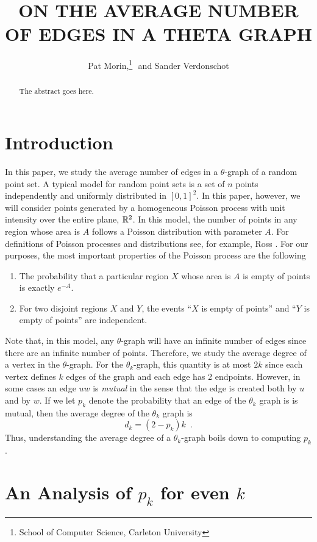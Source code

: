 \documentclass{patmorin}
\title{\MakeUppercase{On the Average Number of Edges in a Theta Graph}}
\author{Pat Morin,\thanks{School of Computer Science, Carleton University}\,\,
         and Sander Verdonschot\footnotemark[1]}
\begin{document}
\maketitle

\begin{abstract}
  The abstract goes here.
\end{abstract}

\section{Introduction}

In this paper, we study the average number of edges in a $\theta$-graph
of a random point set.  A typical model for random point sets is a set
of $n$ points independently and uniformly distributed in $[0,1]^2$.
In this paper, however, we will consider points generated by a
homogeneous Poisson process with unit intensity over the entire
plane, $\mathbb{R}^2$.  In this model, the number of points in any region
whose area is $A$ follows a Poisson distribution with parameter $A$.
For definitions of Poisson processes and distributions see, for example,
Ross \cite[Chapter~2]{ross:introduction}.  For our purposes, the most
important properties of the Poisson process are the following
\begin{enumerate}
\item The probability  that a particular region $X$ whose area is $A$
   is empty of points is exactly $e^{-A}$.
\item For two disjoint regions $X$ and $Y$, the events ``$X$ is empty
   of points'' and ``$Y$ is empty of points'' are independent.
\end{enumerate}
Note that, in this model, any $\theta$-graph will have an infinite number
of edges since there are an infinite number of points.  Therefore,
we study the average degree of a vertex in the $\theta$-graph.  For the
$\theta_k$-graph, this quantity is at most $2k$ since each vertex defines
$k$ edges of the graph and each edge has 2 endpoints.  However, in some
cases an edge $uw$ is \emph{mutual} in the sense that the edge is created
both by $u$ and by $w$.  If we let $p_k$ denote the probability that an
edge of the $\theta_k$ graph is is mutual, then the average degree of
the $\theta_k$ graph is
\[
    d_k = (2-p_k)k \enspace .
\]
Thus, understanding the average degree of a $\theta_k$-graph boils down
to computing $p_k$.

\section{An Analysis of $p_k$ for even $k$}
\end{document}
